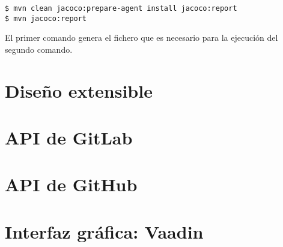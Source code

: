 \begin{minipage}{\linewidth}
{\tiny
\begin{verbatim}
$ mvn clean jacoco:prepare-agent install jacoco:report
$ mvn jacoco:report
\end{verbatim}
}
\end{minipage}

El primer comando genera el fichero  que es necesario para la ejecución del segundo comando.


\section{Diseño extensible}
\section{API de GitLab} %
\section{API de GitHub} %
\section{Interfaz gráfica: Vaadin}